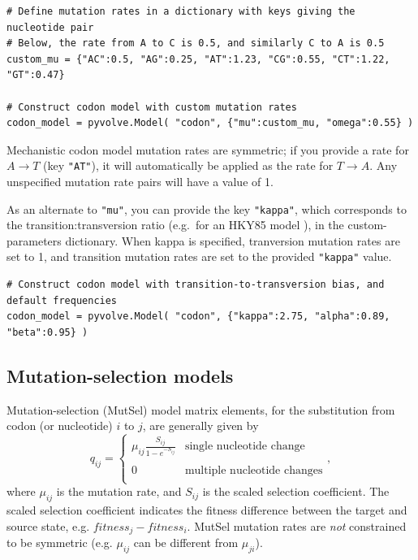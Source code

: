 \documentclass{article}
\newcommand{\code}[1]{\texttt{\small{#1}}}
\begin{document}
\begin{lstlisting}
# Define mutation rates in a dictionary with keys giving the nucleotide pair
# Below, the rate from A to C is 0.5, and similarly C to A is 0.5
custom_mu = {"AC":0.5, "AG":0.25, "AT":1.23, "CG":0.55, "CT":1.22, "GT":0.47} 

# Construct codon model with custom mutation rates
codon_model = pyvolve.Model( "codon", {"mu":custom_mu, "omega":0.55} )
\end{lstlisting}


Mechanistic codon model mutation rates are symmetric; if you provide a rate for $A \rightarrow T$ (key \code{"AT"}), it will automatically be applied as the rate for $T \rightarrow A$. Any unspecified mutation rate pairs will have a value of 1.

As an alternate to \code{"mu"}, you can provide the key \code{"kappa"}, which corresponds to the transition:transversion ratio (e.g.\ for an HKY85  model \citep{HKY85}), in the custom-parameters dictionary. When kappa is specified, tranversion mutation rates are set to 1, and transition mutation rates are set to the provided \code{"kappa"} value.

\begin{lstlisting}
# Construct codon model with transition-to-transversion bias, and default frequencies
codon_model = pyvolve.Model( "codon", {"kappa":2.75, "alpha":0.89, "beta":0.95} )
\end{lstlisting}



\subsection{Mutation-selection models}\label{sec:mutsel_basic}
Mutation-selection (MutSel) model \citep{HB98} matrix elements, for the substitution from codon (or nucleotide) $i$ to $j$, are generally given by 
\begin{equation}
q_{ij} = \left\{ 
\begin{array}{rl}
	\mu_{ij} \frac{S_{ij}}{1-e^{-S_{ij}}} &\text{single nucleotide change} \\\\
	0                                  &\text{multiple nucleotide changes} \\             
\end{array} \right.,
\end{equation} where $\mu_{ij}$ is the mutation rate, and $S_{ij}$ is the scaled selection coefficient. The scaled selection coefficient indicates the fitness difference between the target and source state, e.g. $fitness_j - fitness_i$. MutSel mutation rates are \emph{not} constrained to be symmetric (e.g. $\mu_{ij}$ can be different from $\mu_{ji}$). 
\end{document}
